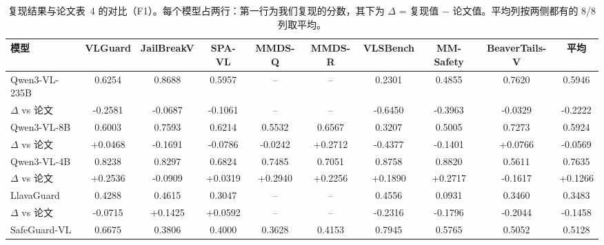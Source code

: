 \documentclass[10pt]{article}
\begin{document}
\begin{table}[t]\centering
\caption{复现结果与论文表~4 的对比（F1）。每个模型占两行：第一行为我们复现的分数，其下为 $\Delta$ = 复现值 $-$ 论文值。平均列按两侧都有的 8/8 列取平均。}
\label{tab:table4-compare}
\begin{tabular}{lccccccccc}\toprule
\rowcolor{headbg} 模型 & VLGuard & JailBreakV & SPA-VL & MMDS-Q & MMDS-R & VLSBench & MM-Safety & BeaverTails-V & 平均 \\\midrule
Qwen3-VL-235B & 0.6254 & 0.8688 & 0.5957 & -- & -- & 0.2301 & 0.4855 & 0.7620 & 0.5946 \\
\rowcolor{rowbg} \hspace{1.2em}$\Delta$ vs 论文 & \textcolor{negdelta}{-0.2581} & \textcolor{negdelta}{-0.0687} & \textcolor{negdelta}{-0.1061} & -- & -- & \textcolor{negdelta}{-0.6450} & \textcolor{negdelta}{-0.3963} & \textcolor{negdelta}{-0.0329} & \textcolor{negdelta}{-0.2222} \\
Qwen3-VL-8B & 0.6003 & 0.7593 & 0.6214 & 0.5532 & 0.6567 & 0.3207 & 0.5005 & 0.7273 & 0.5924 \\
\rowcolor{rowbg} \hspace{1.2em}$\Delta$ vs 论文 & \textcolor{posdelta}{+0.0468} & \textcolor{negdelta}{-0.1691} & \textcolor{negdelta}{-0.0786} & \textcolor{negdelta}{-0.0242} & \textcolor{posdelta}{+0.2712} & \textcolor{negdelta}{-0.4377} & \textcolor{negdelta}{-0.1401} & \textcolor{posdelta}{+0.0766} & \textcolor{negdelta}{-0.0569} \\
Qwen3-VL-4B & 0.8238 & 0.8297 & 0.6824 & 0.7485 & 0.7051 & 0.8758 & 0.8820 & 0.5611 & 0.7635 \\
\rowcolor{rowbg} \hspace{1.2em}$\Delta$ vs 论文 & \textcolor{posdelta}{+0.2536} & \textcolor{negdelta}{-0.0909} & \textcolor{posdelta}{+0.0319} & \textcolor{posdelta}{+0.2940} & \textcolor{posdelta}{+0.2256} & \textcolor{posdelta}{+0.1890} & \textcolor{posdelta}{+0.2717} & \textcolor{negdelta}{-0.1617} & \textcolor{posdelta}{+0.1266} \\
LlavaGuard & 0.4288 & 0.4615 & 0.3047 & -- & -- & 0.4556 & 0.0931 & 0.3460 & 0.3483 \\
\rowcolor{rowbg} \hspace{1.2em}$\Delta$ vs 论文 & \textcolor{negdelta}{-0.0715} & \textcolor{posdelta}{+0.1425} & \textcolor{posdelta}{+0.0592} & -- & -- & \textcolor{negdelta}{-0.2316} & \textcolor{negdelta}{-0.1796} & \textcolor{negdelta}{-0.2044} & \textcolor{negdelta}{-0.1458} \\
SafeGuard-VL & 0.6675 & 0.3806 & 0.4000 & 0.3628 & 0.4153 & 0.7945 & 0.5765 & 0.5052 & 0.5128 \\

\end{tabular}
\end{table}
\end{document}
